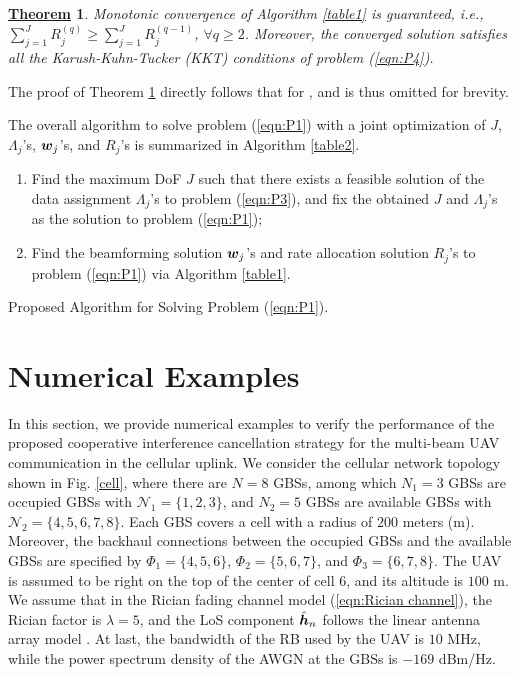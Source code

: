 \documentclass[onecolumn, draftclsnofoot, 12pt]{IEEEtran}
\newtheorem{theorem}{\underline{Theorem}}
\newcommand{\mv}[1]{\mbox{\boldmath{$ #1 $}}}
\begin{document}
\begin{theorem}\label{theorem2}
Monotonic convergence of Algorithm \ref{table1} is guaranteed, i.e., $\sum_{j=1}^J R_j^{(q)}\geq \sum_{j=1}^J R_j^{(q-1)}$, $\forall q\geq 2$. Moreover, the converged solution satisfies all the Karush-Kuhn-Tucker (KKT) conditions of problem (\ref{eqn:P4}).
\end{theorem}
\begin{IEEEproof}
The proof of Theorem \ref{theorem2} directly follows that for \cite[Theorem 1]{SCA}, and is thus omitted for brevity.
\end{IEEEproof}


The overall algorithm to solve problem (\ref{eqn:P1}) with a joint optimization of $J$, $\Lambda_j$'s, $\mv{w}_j$'s, and $R_j$'s is summarized in Algorithm \ref{table2}.

\begin{algorithm}[t]
\begin{enumerate}
\item Find the maximum DoF $J$ such that there exists a feasible solution of the data assignment $\Lambda_j$'s to problem (\ref{eqn:P3}), and fix the obtained $J$ and $\Lambda_j$'s as the solution to problem (\ref{eqn:P1});
\item Find the beamforming solution $\mv{w}_j$'s and rate allocation solution $R_j$'s to problem (\ref{eqn:P1}) via Algorithm \ref{table1}.
\end{enumerate}
\caption{Proposed Algorithm for Solving Problem (\ref{eqn:P1}).}
\label{table2}
\end{algorithm}

\section{Numerical Examples}\label{sec:Numerical Examples}
In this section, we provide numerical examples to verify the performance of the proposed cooperative interference cancellation strategy for the multi-beam UAV communication in the cellular uplink. We consider the cellular network topology shown in Fig. \ref{cell}, where there are $N=8$ GBSs, among which $N_1=3$ GBSs are occupied GBSs with $\mathcal{N}_1=\{1,2,3\}$, and $N_2=5$ GBSs are available GBSs with $\mathcal{N}_2=\{4,5,6,7,8\}$. Each GBS covers a cell with a radius of $200$ meters (m). Moreover, the backhaul connections between the occupied GBSs and the available GBSs are specified by $\Phi_1=\{4,5,6\}$, $\Phi_2=\{5,6,7\}$, and $\Phi_3=\{6,7,8\}$. The UAV is assumed to be right on the top of the center of cell 6, and its altitude is $100$ m. We assume that in the Rician fading channel model (\ref{eqn:Rician channel}), the Rician factor is $\lambda=5$, and the LoS component $\hat{\mv{h}}_n$ follows the linear antenna array model \cite{Luo07}. At last, the bandwidth of the RB used by the UAV is $10$ MHz, while the power spectrum density of the AWGN at the GBSs is $-169$ dBm/Hz.
\end{document}

